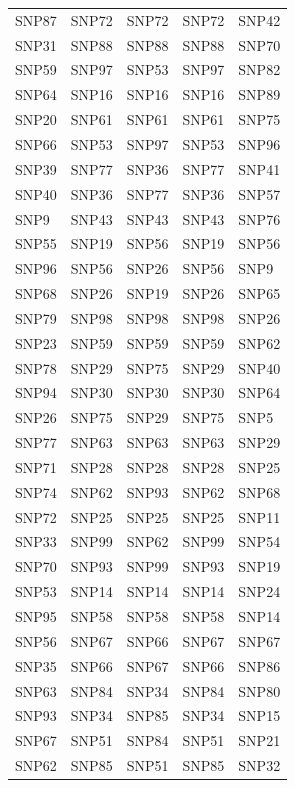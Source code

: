\begin{table}[ht]
\begin{tabular}{lllll}
  SNP87 & SNP72 & SNP72 & SNP72 & SNP42 \\ 
  SNP31 & SNP88 & SNP88 & SNP88 & SNP70 \\ 
  SNP59 & SNP97 & SNP53 & SNP97 & SNP82 \\ 
  SNP64 & SNP16 & SNP16 & SNP16 & SNP89 \\ 
  SNP20 & SNP61 & SNP61 & SNP61 & SNP75 \\ 
  SNP66 & SNP53 & SNP97 & SNP53 & SNP96 \\ 
  SNP39 & SNP77 & SNP36 & SNP77 & SNP41 \\ 
  SNP40 & SNP36 & SNP77 & SNP36 & SNP57 \\ 
  SNP9 & SNP43 & SNP43 & SNP43 & SNP76 \\ 
  SNP55 & SNP19 & SNP56 & SNP19 & SNP56 \\ 
  SNP96 & SNP56 & SNP26 & SNP56 & SNP9 \\ 
  SNP68 & SNP26 & SNP19 & SNP26 & SNP65 \\ 
  SNP79 & SNP98 & SNP98 & SNP98 & SNP26 \\ 
  SNP23 & SNP59 & SNP59 & SNP59 & SNP62 \\ 
  SNP78 & SNP29 & SNP75 & SNP29 & SNP40 \\ 
  SNP94 & SNP30 & SNP30 & SNP30 & SNP64 \\ 
  SNP26 & SNP75 & SNP29 & SNP75 & SNP5 \\ 
  SNP77 & SNP63 & SNP63 & SNP63 & SNP29 \\ 
  SNP71 & SNP28 & SNP28 & SNP28 & SNP25 \\ 
  SNP74 & SNP62 & SNP93 & SNP62 & SNP68 \\ 
  SNP72 & SNP25 & SNP25 & SNP25 & SNP11 \\ 
  SNP33 & SNP99 & SNP62 & SNP99 & SNP54 \\ 
  SNP70 & SNP93 & SNP99 & SNP93 & SNP19 \\ 
  SNP53 & SNP14 & SNP14 & SNP14 & SNP24 \\ 
  SNP95 & SNP58 & SNP58 & SNP58 & SNP14 \\ 
  SNP56 & SNP67 & SNP66 & SNP67 & SNP67 \\ 
  SNP35 & SNP66 & SNP67 & SNP66 & SNP86 \\ 
  SNP63 & SNP84 & SNP34 & SNP84 & SNP80 \\ 
  SNP93 & SNP34 & SNP85 & SNP34 & SNP15 \\ 
  SNP67 & SNP51 & SNP84 & SNP51 & SNP21 \\ 
  SNP62 & SNP85 & SNP51 & SNP85 & SNP32 \\ 

\end{tabular}
\end{table}
